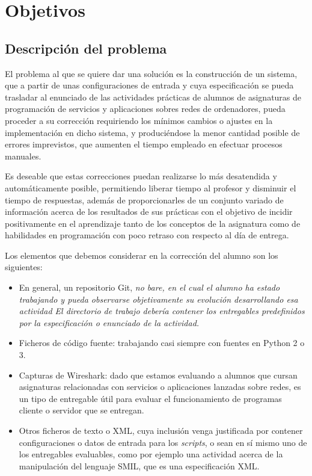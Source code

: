 \cleardoublepage
\chapter{Objetivos}
\label{chap:objetivos}


\section{Descripción del problema}
\label{sec:des_problema}


El problema al que se quiere dar una solución es la construcción de un sistema, que a partir de unas configuraciones de entrada y cuya especificación se pueda trasladar al enunciado de las actividades prácticas de alumnos de asignaturas de programación de servicios y aplicaciones sobres redes de ordenadores, pueda proceder a su corrección requiriendo los mínimos cambios o ajustes en la implementación en dicho sistema, y produciéndose la menor cantidad posible de errores imprevistos, que aumenten el tiempo empleado en efectuar procesos manuales.


Es deseable que estas correcciones puedan realizarse lo más desatendida y automáticamente posible, permitiendo liberar tiempo al profesor y disminuir el tiempo de respuestas, además de proporcionarles de un conjunto variado de información acerca de los resultados de sus prácticas con el objetivo de incidir positivamente en el aprendizaje tanto de los conceptos de la asignatura como de habilidades en programación con poco retraso con respecto al día de entrega.


Los elementos que debemos considerar en la corrección del alumno son los siguientes:

\begin{itemize}
\item En general, un repositorio Git, \it{no bare}, en el cual el alumno ha estado trabajando y pueda observarse objetivamente su evolución desarrollando esa actividad El directorio de trabajo debería contener los entregables predefinidos por la especificación o enunciado de la actividad.

\item Ficheros de código fuente: trabajando casi siempre con fuentes en Python 2 o 3.

\item Capturas de Wireshark: dado que estamos evaluando a alumnos que cursan asignaturas relacionadas con servicios o aplicaciones lanzadas sobre redes, es un tipo de entregable útil para evaluar el funcionamiento de programas cliente o servidor que se entregan.

\item Otros ficheros de texto o XML, cuya inclusión venga justificada por contener configuraciones o datos de entrada para los \textit{scripts}, o sean en sí mismo uno de los entregables evaluables, como por ejemplo una actividad acerca de la manipulación del lenguaje SMIL, que es una especificación XML.
\end{itemize}


